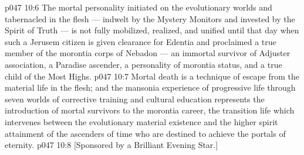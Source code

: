 \vs p047 10:6 \pc The mortal personality initiated on the evolutionary worlds and tabernacled in the flesh --- indwelt by the Mystery Monitors and invested by the Spirit of Truth --- is not fully mobilized, realized, and unified until that day when such a Jerusem citizen is given clearance for Edentia and proclaimed a true member of the morontia corps of Nebadon --- an immortal survivor of Adjuster association, a Paradise ascender, a personality of morontia status, and a true child of the Most Highs.
\vs p047 10:7 \pc Mortal death is a technique of escape from the material life in the flesh; and the mansonia experience of progressive life through seven worlds of corrective training and cultural education represents the introduction of mortal survivors to the morontia career, the transition life which intervenes between the evolutionary material existence and the higher spirit attainment of the ascenders of time who are destined to achieve the portals of eternity.
\vsetoff
\vs p047 10:8 [Sponsored by a Brilliant Evening Star.]
\quizlink
